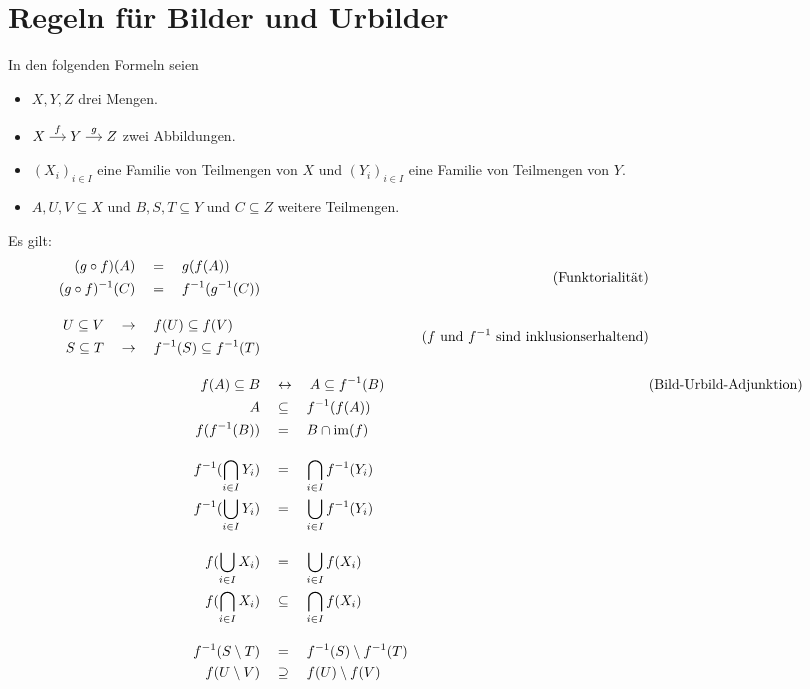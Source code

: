 \section{Regeln für Bilder und Urbilder}
In den folgenden Formeln seien
\begin{itemize}
    \item $X,Y,Z$ drei Mengen.
    \item $\begin{tikzcd}[cramped, column sep=small] X \ar[r, "f"] &  Y\ar[r, "g"] & Z \end{tikzcd}$ zwei Abbildungen.
    \item $(X_i)_{i\in I}$ eine Familie von Teilmengen von $X$ und $(Y_i)_{i\in I}$ eine Familie von Teilmengen von $Y$.
    \item $A,U,V\subseteq X$ und $B,S,T\subseteq Y$ und $C\subseteq Z$ weitere Teilmengen.
\end{itemize}
Es gilt:
\begingroup
\allowdisplaybreaks
\begin{align*}
    \begin{split}
    (g\circ f)(A) & \quad=\quad g(f(A)) \\
    (g\circ f)^{-1}(C) & \quad=\quad f^{-1}(g^{-1}(C))
    \end{split} && (\text{Funktorialität}) \\[1em]
    \begin{split}
        U\subseteq V & \quad \to\quad f(U) \subseteq f(V) \\
        S\subseteq T & \quad \to\quad f^{-1}(S)\subseteq f^{-1}(T)
    \end{split} && (\text{$f$ und $f^{-1}$ sind inklusionserhaltend}) \\[1em]
    f(A) \subseteq B & \quad \leftrightarrow\quad A \subseteq f^{-1}(B) && (\text{Bild-Urbild-Adjunktion}) \\
    A & \quad \subseteq\quad f^{-1}(f(A)) \\
    f(f^{-1}(B)) & \quad=\quad B\cap \operatorname{im}(f) \\[1em]
    f^{-1}(\bigcap_{i \in I} Y_i) & \quad=\quad \bigcap_{i \in I} f^{-1}(Y_i) \\
    f^{-1} (\bigcup_{i \in I} Y_i) & \quad=\quad \bigcup_{i \in I} f^{-1}(Y_i) \\[1em]
    f(\bigcup_{i \in I} X_i) & \quad=\quad \bigcup_{i \in I} f(X_i) \\
    f(\bigcap_{i \in I} X_i) & \quad \subseteq\quad \bigcap_{i \in I} f(X_i) \\[1em]
    f^{-1}(S\setminus T) & \quad=\quad f^{-1}(S)\setminus f^{-1}(T) \\
    f(U\setminus V) & \quad \supseteq\quad f(U)\setminus f(V)
\end{align*}
\endgroup




